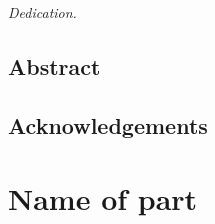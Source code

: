 \documentclass[b5paper]{book}
\begin{document}
\null{}
\begin{flushright}
    {\itshape%
    Dedication.
    }
\end{flushright}
\null{}


\chapter*{Abstract}

\lipsum[1]


\makeatletter
\@openrightfalse	%
\chapter*{Acknowledgements}
\@openrighttrue		%
\makeatother

\lipsum[1]


\tableofcontents
\markboth{}{}	%

\ifnum{}
    \makeatletter
    \@openrightfalse    %
    \listoffigures
    \markboth{}{}
    \listoftables
    \markboth{}{}
    \@openrighttrue		%
    \makeatother
\fi


\mainmatter

\graphicspath{{subfiles/introduction/figures/}}



\part[Name of part (for table of content)]{Name of part}
\label{part:name_of_part_1}

\graphicspath{{subfiles/name_of_subfile_1/figures/}}


\graphicspath{{subfiles/name_of_subfile_2/figures/}}

\end{document}
